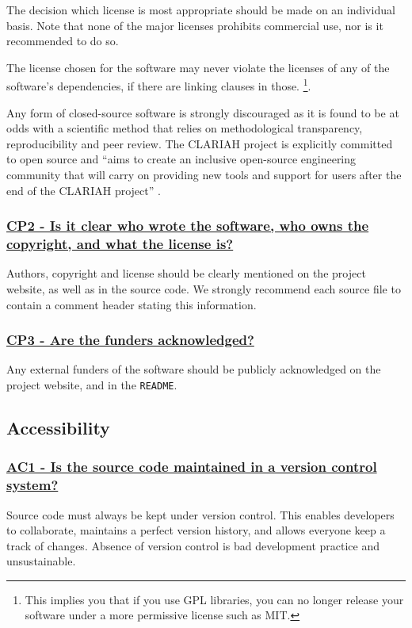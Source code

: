 \documentclass[a4paper,11pt]{article}
\newcommand{\criterion}[2]{\subsubsection*{\underline{#1 - #2}}\label{id:#1}}
\newcommand\CheckTable{%
  \begin{tabular}{ccccc}
    No & Minimal & Adequate & Good & Perfect \\
    0 & 1 & 2 & 3 & 4 \\
    \hline
    $\square$ & $\square$ & $\square$ & $\square$ & $\square$ \\
  \end{tabular}%
}
\begin{document}
The decision which license is most appropriate should be made on an individual
basis. Note that none of the major licenses prohibits commercial use, nor is it
recommended to do so.

The license chosen for the software may never violate the licenses of any of
the software's dependencies, if there are linking clauses in those. \footnote{This implies you that if you use GPL libraries, you can no longer release your software under a more permissive license such as MIT.}.

Any form of closed-source software is strongly discouraged as it is found to be
at odds with a scientific method that relies on methodological transparency,
reproducibility and peer review. The CLARIAH project is explicitly committed to
open source and ``aims to create an inclusive open-source engineering community
that will carry on providing new tools and support for users after the end of
the CLARIAH project'' \citep{CLARIAHTECHPLAN1}.


\newcommand{\cpTwoID}{CP2}
\newcommand{\cpTwoText}{Is it clear who wrote the software, who owns the copyright, and what the license is?}
\criterion{\cpTwoID}{\cpTwoText}

Authors, copyright and license should be clearly mentioned on the project
website, as well as in the source code.  We strongly recommend each source file to contain a comment header stating this information.


\newcommand{\cpThreeID}{CP3}
\newcommand{\cpThreeText}{Are the funders acknowledged?}
\criterion{\cpThreeID}{\cpThreeText}

Any external funders of the software should be publicly acknowledged on the project
website, and in the \texttt{README}.


\subsection{Accessibility}\label{sec:acc}

\newcommand{\acOneID}{AC1}
\newcommand{\acOneText}{Is the source code maintained in a version control system?}
\criterion{\acOneID}{\acOneText}

Source code must always be kept under version control. This enables developers
to collaborate, maintains a perfect version history, and allows everyone keep a
track of changes. Absence of version control is bad development practice and
unsustainable.
\end{document}
